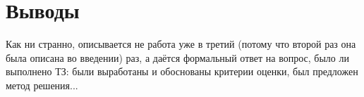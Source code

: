 \chapter*{Выводы}

Как ни странно, описывается не работа уже в третий (потому что второй раз она была описана во введении) раз, а даётся формальный ответ на вопрос, было ли выполнено ТЗ: были выработаны и обоснованы критерии оценки, был предложен метод решения...




